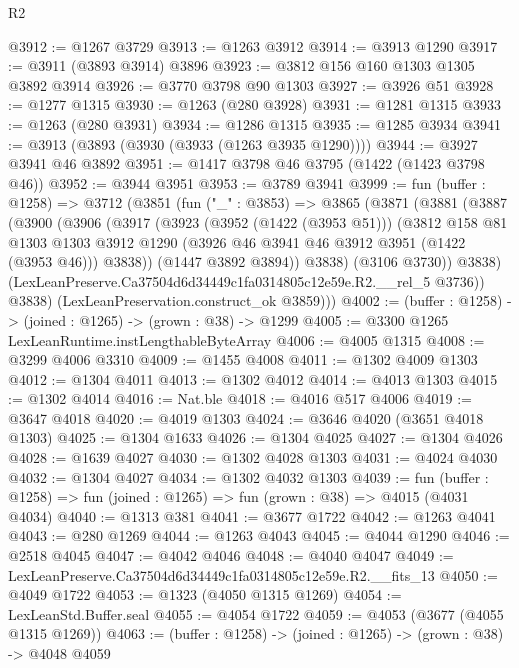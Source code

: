 \begin{lexlean}{R2}
\begin{coremodule}
@3912 := @1267 @3729
@3913 := @1263 @3912
@3914 := @3913 @1290
@3917 := @3911 (@3893 @3914) @3896
@3923 := @3812 @156 @160 @1303 @1305 @3892 @3914
@3926 := @3770 @3798 @90 @1303
@3927 := @3926 @51
@3928 := @1277 @1315
@3930 := @1263 (@280 @3928)
@3931 := @1281 @1315
@3933 := @1263 (@280 @3931)
@3934 := @1286 @1315
@3935 := @1285 @3934
@3941 := @3913 (@3893 (@3930 (@3933 (@1263 @3935 @1290))))
@3944 := @3927 @3941 @46 @3892
@3951 := @1417 @3798 @46 @3795 (@1422 (@1423 @3798 @46))
@3952 := @3944 @3951
@3953 := @3789 @3941
@3999 := fun (buffer : @1258) =>
  @3712
    (@3851
      (fun ("_" : @3853) =>
      @3865
        (@3871
          (@3881
            (@3887
              (@3900
                (@3906
                  (@3917
                    (@3923
                      (@3952 (@1422 (@3953 @51)))
                      (@3812
                        @158
                        @81
                        @1303
                        @1303
                        @3912
                        @1290
                        (@3926 @46 @3941 @46 @3912 @3951 (@1422 (@3953 @46)))
                        @3838))
                    (@1447 @3892 @3894))
                  @3838)
                (@3106 @3730))
              @3838)
            (LexLeanPreserve.Ca37504d6d34449c1fa0314805c12e59e.R2.__rel_5 @3736))
          @3838)
        (LexLeanPreservation.construct_ok @3859)))
@4002 := (buffer : @1258) -> (joined : @1265) -> (grown : @38) -> @1299
@4005 := @3300 @1265 LexLeanRuntime.instLengthableByteArray
@4006 := @4005 @1315
@4008 := @3299 @4006 @3310
@4009 := @1455 @4008
@4011 := @1302 @4009 @1303
@4012 := @1304 @4011
@4013 := @1302 @4012
@4014 := @4013 @1303
@4015 := @1302 @4014
@4016 := Nat.ble
@4018 := @4016 @517 @4006
@4019 := @3647 @4018
@4020 := @4019 @1303
@4024 := @3646 @4020 (@3651 @4018 @1303)
@4025 := @1304 @1633
@4026 := @1304 @4025
@4027 := @1304 @4026
@4028 := @1639 @4027
@4030 := @1302 @4028 @1303
@4031 := @4024 @4030
@4032 := @1304 @4027
@4034 := @1302 @4032 @1303
@4039 := fun (buffer : @1258) => fun (joined : @1265) => fun (grown : @38) => @4015 (@4031 @4034)
@4040 := @1313 @381
@4041 := @3677 @1722
@4042 := @1263 @4041
@4043 := @280 @1269
@4044 := @1263 @4043
@4045 := @4044 @1290
@4046 := @2518 @4045
@4047 := @4042 @4046
@4048 := @4040 @4047
@4049 := LexLeanPreserve.Ca37504d6d34449c1fa0314805c12e59e.R2.__fits_13
@4050 := @4049 @1722
@4053 := @1323 (@4050 @1315 @1269)
@4054 := LexLeanStd.Buffer.seal
@4055 := @4054 @1722
@4059 := @4053 (@3677 (@4055 @1315 @1269))
@4063 := (buffer : @1258) -> (joined : @1265) -> (grown : @38) -> @4048 @4059

\end{coremodule}
\end{lexlean}
